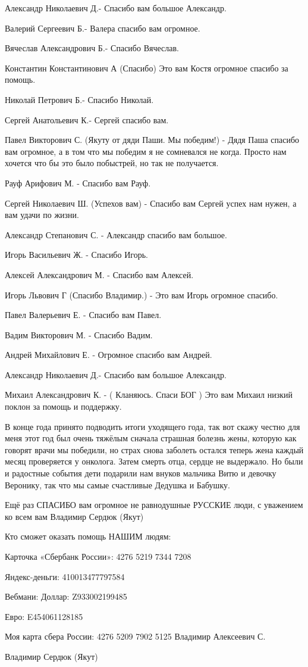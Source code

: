 
Александр Николаевич Д.- Спасибо вам большое Александр.

Валерий Сергеевич Б.- Валера спасибо вам огромное.

Вячеслав Александрович Б.- Спасибо Вячеслав.

Константин Константинович А (Спасибо) Это вам Костя огромное спасибо за помощь.

Николай Петрович Б.- Спасибо Николай.

Сергей Анатольевич К.- Сергей спасибо вам.

Павел Викторович С. (Якуту от дяди Паши. Мы победим!) - Дядя Паша спасибо вам
огромное, а в том что мы победим я не сомневался не когда. Просто нам хочется
что бы это было побыстрей, но так не получается.

Рауф Арифович М. - Спасибо вам Рауф.

Сергей Николаевич Ш. (Успехов вам) - Спасибо вам Сергей успех нам нужен, а вам
удачи по жизни.

Александр Степанович С. - Александр спасибо вам большое.

Игорь Васильевич Ж. - Спасибо Игорь.

Алексей Александрович М. - Спасибо вам Алексей.

Игорь Львович Г (Спасибо Владимир.) - Это вам Игорь огромное спасибо.

Павел Валерьевич Е. - Спасибо вам Павел.

Вадим Викторович М. - Спасибо Вадим.

Андрей Михайлович Е. - Огромное спасибо вам Андрей.

Александр Николаевич Д.- Спасибо вам большое Александр.

Михаил Александрович К. - ( Кланяюсь. Спаси БОГ ) Это вам Михаил низкий поклон
за помощь и поддержку.

В конце года принято подводить итоги уходящего года, так вот скажу честно для
меня этот год был очень тяжёлым сначала страшная болезнь жены, которую как
говорят врачи мы победили, но страх снова заболеть остался теперь жена каждый
месяц проверяется у онколога. Затем смерть отца, сердце не выдержало. Но были и
радостные события дети подарили нам внуков мальчика Витю и девочку Веронику,
так что мы самые счастливые Дедушка и Бабушку.

Ещё раз СПАСИБО вам огромное не равнодушные РУССКИЕ люди, с уважением ко всем
вам Владимир Сердюк (Якут)

Кто сможет оказать помощь НАШИМ людям:

Карточка «Сбербанк России»: 4276 5219 7344 7208

Яндекс-деньги: 410013477797584

Вебмани: Доллар: Z933002199485

Евро: E454061128185

Моя карта сбера России: 4276 5209 7902 5125 Владимир Алексеевич С.

Владимир Сердюк (Якут)
